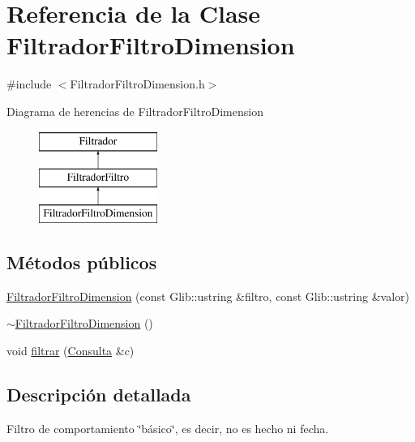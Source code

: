 \hypertarget{classFiltradorFiltroDimension}{\section{\-Referencia de la \-Clase \-Filtrador\-Filtro\-Dimension}
\label{classFiltradorFiltroDimension}
}


{\ttfamily \#include $<$\-Filtrador\-Filtro\-Dimension.\-h$>$}

\-Diagrama de herencias de \-Filtrador\-Filtro\-Dimension\begin{figure}[H]
\begin{center}
\leavevmode
\includegraphics[height=3.000000cm]{classFiltradorFiltroDimension}
\end{center}
\end{figure}
\subsection*{\-Métodos públicos}
\begin{DoxyCompactItemize}
\item 
\hyperlink{classFiltradorFiltroDimension_ae4ed8edd4388b199e5d5bbfedd072bde}{\-Filtrador\-Filtro\-Dimension} (const \-Glib\-::ustring \&filtro, const \-Glib\-::ustring \&valor)
\item 
\hyperlink{classFiltradorFiltroDimension_a93fe672b572712527a550f15fa43edf3}{$\sim$\-Filtrador\-Filtro\-Dimension} ()
\item 
void \hyperlink{classFiltradorFiltroDimension_ab5facda7f5d2953ceb58e96e8be9a2a8}{filtrar} (\hyperlink{classConsulta}{\-Consulta} \&c)
\end{DoxyCompactItemize}


\subsection{\-Descripción detallada}
\-Filtro de comportamiento \char`\"{}básico\char`\"{}, es decir, no es hecho ni fecha. 

